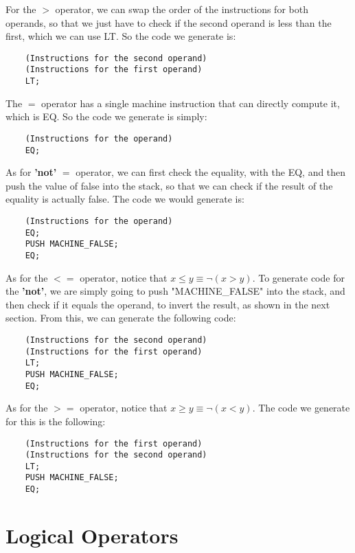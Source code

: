 \documentclass{article}
\begin{document}
For the $>$ operator, we can swap the order of the instructions for both operands, so that we just have to check if the second operand is less than the first, which we can use LT. So the code we generate is:

\begin{lstlisting}
    (Instructions for the second operand)
    (Instructions for the first operand)
    LT;
\end{lstlisting}

The $=$ operator has a single machine instruction that can directly compute it, which is EQ. So the code we generate is simply:

\begin{lstlisting}
    (Instructions for the operand)
    EQ;
\end{lstlisting}

As for \textbf{'not'} $=$ operator, we can first check the equality, with the EQ, and then push the value of false into the stack, so that we can check if the result of the equality is actually false. The code we would generate is:

\begin{lstlisting}
    (Instructions for the operand)
    EQ;
    PUSH MACHINE_FALSE;
    EQ;
\end{lstlisting}

As for the $<=$ operator, notice that $x \leq y \equiv \lnot(x > y)$. To generate code for the \textbf{'not'}, we are simply going to push 
"MACHINE\_FALSE" into the stack, and then check if it equals the operand, to invert the result, as shown in the next section. From this, we can generate the following code:

\begin{lstlisting}
    (Instructions for the second operand)
    (Instructions for the first operand)
    LT;
    PUSH MACHINE_FALSE;
    EQ;
\end{lstlisting}

As for the $>=$ operator, notice that $x \geq y \equiv \lnot(x < y)$. The code we generate for this is the following:

\begin{lstlisting}
    (Instructions for the first operand)
    (Instructions for the second operand)
    LT;
    PUSH MACHINE_FALSE;
    EQ;
\end{lstlisting}

\section{Logical Operators}
\end{document}
